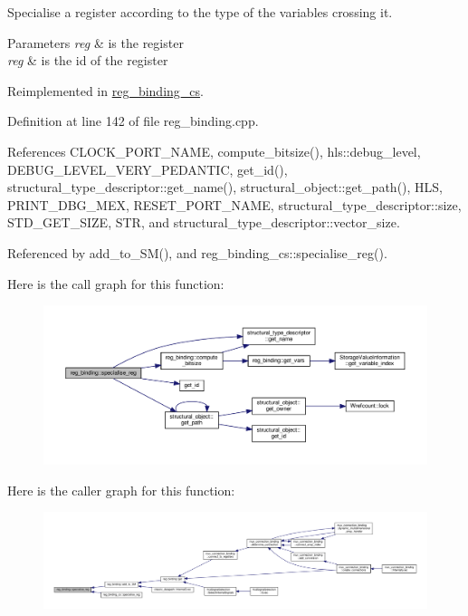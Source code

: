 Specialise a register according to the type of the variables crossing it. 


\begin{DoxyParams}{Parameters}
{\em reg} & is the register \\
\hline
{\em reg} & is the id of the register \\
\hline
\end{DoxyParams}


Reimplemented in \hyperlink{classreg__binding__cs_acb0a006d620a6320239cc3973cf2198c}{reg\+\_\+binding\+\_\+cs}.



Definition at line 142 of file reg\+\_\+binding.\+cpp.



References C\+L\+O\+C\+K\+\_\+\+P\+O\+R\+T\+\_\+\+N\+A\+ME, compute\+\_\+bitsize(), hls\+::debug\+\_\+level, D\+E\+B\+U\+G\+\_\+\+L\+E\+V\+E\+L\+\_\+\+V\+E\+R\+Y\+\_\+\+P\+E\+D\+A\+N\+T\+IC, get\+\_\+id(), structural\+\_\+type\+\_\+descriptor\+::get\+\_\+name(), structural\+\_\+object\+::get\+\_\+path(), H\+LS, P\+R\+I\+N\+T\+\_\+\+D\+B\+G\+\_\+\+M\+EX, R\+E\+S\+E\+T\+\_\+\+P\+O\+R\+T\+\_\+\+N\+A\+ME, structural\+\_\+type\+\_\+descriptor\+::size, S\+T\+D\+\_\+\+G\+E\+T\+\_\+\+S\+I\+ZE, S\+TR, and structural\+\_\+type\+\_\+descriptor\+::vector\+\_\+size.



Referenced by add\+\_\+to\+\_\+\+S\+M(), and reg\+\_\+binding\+\_\+cs\+::specialise\+\_\+reg().

Here is the call graph for this function\+:
\nopagebreak
\begin{figure}[H]
\begin{center}
\leavevmode
\includegraphics[width=350pt]{da/d7c/classreg__binding_a3b84d34513f28b85ddbd578b2d0ce191_cgraph}
\end{center}
\end{figure}
Here is the caller graph for this function\+:
\nopagebreak
\begin{figure}[H]
\begin{center}
\leavevmode
\includegraphics[width=350pt]{da/d7c/classreg__binding_a3b84d34513f28b85ddbd578b2d0ce191_icgraph}
\end{center}
\end{figure}


